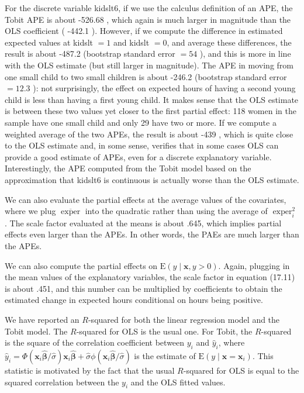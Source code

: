 \documentclass[10pt]{article}
\begin{document}
For the discrete variable kidslt6, if we use the calculus definition of an APE, the Tobit APE is about -526.68 , which again is much larger in magnitude than the OLS coefficient ( -442.1 ). However, if we compute the difference in estimated expected values at kidslt $=1$ and kidslt $=0$, and average these differences, the result is about -487.2 (bootstrap standard error $=54$ ), and this is more in line with the OLS estimate (but still larger in magnitude). The APE in moving from one small child to two small children is about -246.2 (bootstrap standard error $=12.3$ ): not surprisingly, the effect on expected hours of having a second young child is less than having a first young child. It makes sense that the OLS estimate is between these two values yet closer to the first partial effect: 118 women in the sample have one small child and only 29 have two or more. If we compute a weighted average of the two APEs, the result is about -439 , which is quite close to the OLS estimate and, in some sense, verifies that in some cases OLS can provide a good estimate of APEs, even for a discrete explanatory variable. Interestingly, the APE computed from the Tobit model based on the approximation that kidslt6 is continuous is actually worse than the OLS estimate.

We can also evaluate the partial effects at the average values of the covariates, where we plug $\overline{\operatorname{exper}}$ into the quadratic rather than using the average of $\operatorname{exper}_{i}^{2}$. The scale factor evaluated at the means is about .645, which implies partial effects even larger than the APEs. In other words, the PAEs are much larger than the APEs.

We can also compute the partial effects on $\mathrm{E}(y \mid \mathbf{x}, y>0)$. Again, plugging in the mean values of the explanatory variables, the scale factor in equation (17.11) is about .451, and this number can be multiplied by coefficients to obtain the estimated change in expected hours conditional on hours being positive.

We have reported an $R$-squared for both the linear regression model and the Tobit model. The $R$-squared for OLS is the usual one. For Tobit, the $R$-squared is the square of the correlation coefficient between $y_{i}$ and $\hat{y}_{i}$, where $\hat{y}_{i}=\Phi\left(\mathbf{x}_{i} \hat{\boldsymbol{\beta}} / \hat{\sigma}\right) \mathbf{x}_{i} \hat{\boldsymbol{\beta}}+ \hat{\sigma} \phi\left(\mathbf{x}_{i} \hat{\boldsymbol{\beta}} / \hat{\sigma}\right)$ is the estimate of $\mathrm{E}\left(y \mid \mathbf{x}=\mathbf{x}_{i}\right)$. This statistic is motivated by the fact that the usual $R$-squared for OLS is equal to the squared correlation between the $y_{i}$ and the OLS fitted values.
\end{document}
